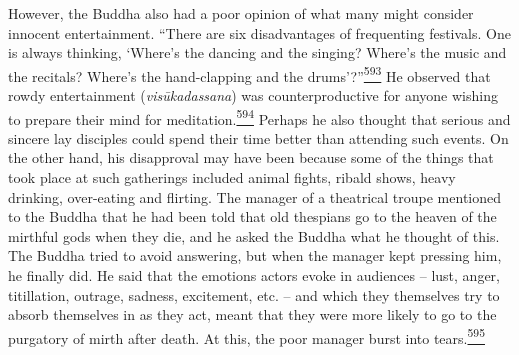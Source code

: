 However, the Buddha also had a poor opinion of what many might consider
innocent entertainment. ``There are six disadvantages of frequenting
festivals. One is always thinking, `Where's the dancing and the singing?
Where's the music and the recitals? Where's the hand-clapping and the
drums'?''\label{footprints_split_015.html_fnref593}\hyperref[footprints_split_025.htmlux5cux23fn593]{\textsuperscript{593}}
He observed that rowdy entertainment (\emph{visūkadassana}) was
counterproductive for anyone wishing to prepare their mind for
meditation.\label{footprints_split_015.html_fnref594}\hyperref[footprints_split_025.htmlux5cux23fn594]{\textsuperscript{594}}
Perhaps he also thought that serious and sincere lay disciples could
spend their time better than attending such events. On the other hand,
his disapproval may have been because some of the things that took place
at such gatherings included animal fights, ribald shows, heavy drinking,
over-eating and flirting. The manager of a theatrical troupe mentioned
to the Buddha that he had been told that old thespians go to the heaven
of the mirthful gods when they die, and he asked the Buddha what he
thought of this. The Buddha tried to avoid answering, but when the
manager kept pressing him, he finally did. He said that the emotions
actors evoke in audiences -- lust, anger, titillation, outrage, sadness,
excitement, etc. -- and which they themselves try to absorb themselves
in as they act, meant that they were more likely to go to the purgatory
of mirth after death. At this, the poor manager burst into
tears.\label{footprints_split_015.html_fnref595}\hyperref[footprints_split_025.htmlux5cux23fn595]{\textsuperscript{595}}


